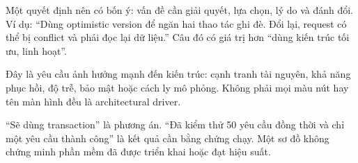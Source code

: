 Một quyết định nên có bốn ý: vấn đề cần giải quyết, lựa chọn, lý do và đánh đổi. Ví dụ: ``Dùng optimistic version để ngăn hai thao tác ghi đè. Đổi lại, request có thể bị conflict và phải đọc lại dữ liệu.'' Câu đó có giá trị hơn ``dùng kiến trúc tối ưu, linh hoạt''.

Đây là yêu cầu ảnh hưởng mạnh đến kiến trúc: cạnh tranh tài nguyên, khả năng phục hồi, độ trễ, bảo mật hoặc cách ly mô phỏng. Không phải mọi màu nút hay tên màn hình đều là architectural driver.

``Sẽ dùng transaction'' là phương án. ``Đã kiểm thử 50 yêu cầu đồng thời và chỉ một yêu cầu thành công'' là kết quả cần bằng chứng chạy. Một sơ đồ không chứng minh phần mềm đã được triển khai hoặc đạt hiệu suất.
